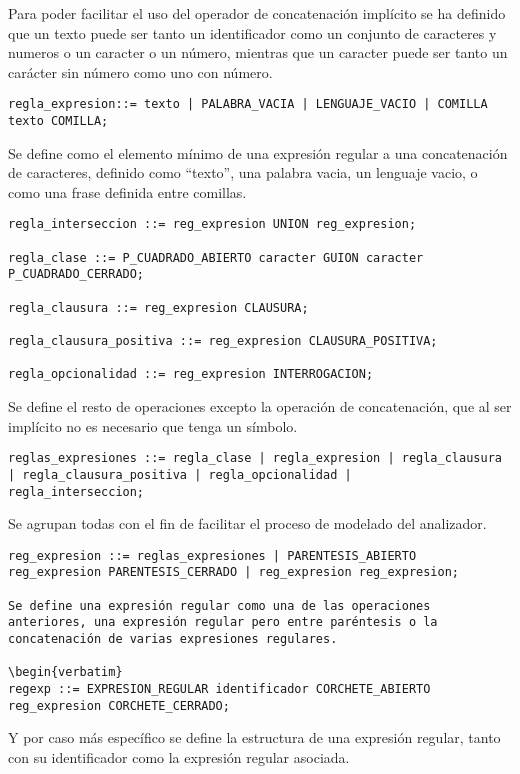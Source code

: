 \documentclass{llncs}
\begin{document}
Para poder facilitar el uso del operador de concatenación implícito se ha definido que un texto puede ser tanto un identificador como un conjunto de caracteres y numeros o un caracter o un número, mientras que un caracter puede ser tanto un carácter sin número como uno con número.

\begin{verbatim}
regla_expresion::= texto | PALABRA_VACIA | LENGUAJE_VACIO | COMILLA texto COMILLA;
\end{verbatim} 

Se define como el elemento mínimo de una expresión regular a una concatenación de caracteres, definido como “texto”, una palabra vacia, un lenguaje vacio, o como una frase definida entre comillas.

\begin{verbatim}
regla_interseccion ::= reg_expresion UNION reg_expresion;        

regla_clase ::= P_CUADRADO_ABIERTO caracter GUION caracter P_CUADRADO_CERRADO;

regla_clausura ::= reg_expresion CLAUSURA;

regla_clausura_positiva ::= reg_expresion CLAUSURA_POSITIVA;

regla_opcionalidad ::= reg_expresion INTERROGACION;
\end{verbatim} 

Se define el resto de operaciones excepto la operación de concatenación, que al ser implícito no es necesario que tenga un símbolo.

\begin{verbatim}
reglas_expresiones ::= regla_clase | regla_expresion | regla_clausura | regla_clausura_positiva | regla_opcionalidad |
regla_interseccion;
\end{verbatim} 

Se agrupan todas con el fin de facilitar el proceso de modelado del analizador.

\begin{verbatim}
reg_expresion ::= reglas_expresiones | PARENTESIS_ABIERTO reg_expresion PARENTESIS_CERRADO | reg_expresion reg_expresion;

Se define una expresión regular como una de las operaciones anteriores, una expresión regular pero entre paréntesis o la concatenación de varias expresiones regulares.

\begin{verbatim}
regexp ::= EXPRESION_REGULAR identificador CORCHETE_ABIERTO reg_expresion CORCHETE_CERRADO;
\end{verbatim} 

Y por caso más específico se define la estructura de una expresión regular, tanto con su identificador como la expresión regular asociada.
\end{document}
